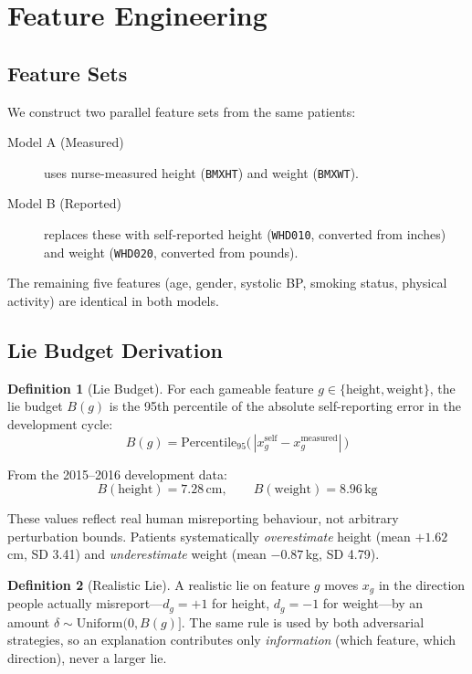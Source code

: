 \documentclass[12pt, a4paper, oneside]{report}
\theoremstyle{definition}
\newtheorem{definition}{Definition}[chapter]
\begin{document}
\section{Feature Engineering}

\subsection{Feature Sets}

We construct two parallel feature sets from the same patients:

\begin{description}
  \item[Model A (Measured)] uses nurse-measured height (\texttt{BMXHT}) and
       weight (\texttt{BMXWT}).
  \item[Model B (Reported)] replaces these with self-reported height
       (\texttt{WHD010}, converted from inches) and weight (\texttt{WHD020},
       converted from pounds).
\end{description}

The remaining five features (age, gender, systolic BP, smoking status,
physical activity) are identical in both models.

\subsection{Lie Budget Derivation}

\begin{definition}[Lie Budget]
  For each gameable feature $g \in \{\text{height}, \text{weight}\}$, the
  lie budget $B(g)$ is the 95th percentile of the absolute self-reporting
  error in the development cycle:
  \[
    B(g) = \mathrm{Percentile}_{95}\bigl(\,|x_g^{\text{self}} - x_g^{\text{measured}}|\,\bigr)
  \]
\end{definition}

From the 2015--2016 development data:
\[
  B(\text{height}) = 7.28\,\text{cm}, \qquad B(\text{weight}) = 8.96\,\text{kg}
\]

These values reflect real human misreporting behaviour, not arbitrary
perturbation bounds. Patients systematically \textit{overestimate} height
(mean $+1.62$\,cm, SD 3.41) and \textit{underestimate} weight (mean
$-0.87$\,kg, SD 4.79).

\begin{definition}[Realistic Lie]
  A realistic lie on feature $g$ moves $x_g$ in the direction people
  actually misreport---$d_g = +1$ for height, $d_g = -1$ for
  weight---by an amount $\delta \sim \mathrm{Uniform}(0, B(g)]$. The
  same rule is used by both adversarial strategies, so an explanation
  contributes only \emph{information} (which feature, which direction),
  never a larger lie.
\end{definition}
\end{document}

